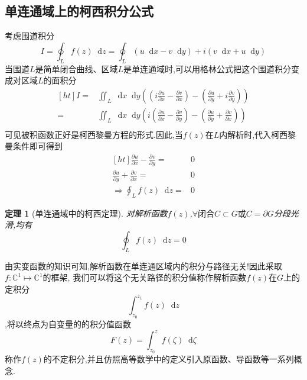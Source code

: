 \documentclass[UTF8]{ctexart}
\newcommand{\dif}{\mathop{}\!\mathrm{d}}
\newtheorem{theorem}{定理}
\begin{document}
\subsection{单连通域上的柯西积分公式}
考虑围道积分
\begin{equation}
  I=\oint_{L}f(z)\dif z=\oint_{L}(u\dif x-v\dif y)+i(v\dif x+u\dif y)
\end{equation}
当围道$L$是简单闭合曲线、区域$L$是单连通域时,可以用格林公式把这个围道积分变成对区域$L$的面积分
\begin{equation}
  \begin{aligned}
    [ht]
    I=&\iint_{L}\dif x\dif y \left(\left(i\frac{\partial u}{\partial x}-\frac{\partial v}{\partial x}\right)-\left(\frac{\partial u}{\partial y}+i\frac{\partial v}{\partial y}\right)\right) \\
  =&\iint_{L}\dif x\dif y \left(i\left(\frac{\partial u}{\partial x}-\frac{\partial v}{\partial y}\right)-\left(\frac{\partial u}{\partial y}+\frac{\partial v}{\partial x}\right)\right) \\
  \end{aligned}
\end{equation}
可见被积函数正好是柯西黎曼方程的形式.因此,当$f(z)$在$L$内解析时,代入柯西黎曼条件即可得到
\begin{equation}
  \begin{aligned}
    [ht]
    \frac{\partial u}{\partial x}-\frac{\partial v}{\partial y}=&0 \\
  \frac{\partial u}{\partial y}+\frac{\partial v}{\partial x}=&0 \\
  \Rightarrow \oint_{L}f(z)\dif z=&0
  \end{aligned}
\end{equation}
\begin{theorem}[单连通域中的柯西定理]
  对解析函数$f(z)$,$\forall \text{闭合}C\subset G\text{或}C=\partial G$分段光滑,均有
  \begin{equation}
    \oint_{L}f(z)\dif z=0
  \end{equation}
\end{theorem}
由实变函数的知识可知,解析函数在单连通区域内的积分与路径无关!因此采取$f : \mathbb{C}^{1} \mapsto\mathbb{C}^{1}$的框架,
我们可以将这个无关路径的积分值称作解析函数$f(z)$在$G$上的定积分
\begin{equation}
  \int_{z_{0}}^{z_{1}}f(z)\dif z
\end{equation}
,将以终点为自变量的的积分值函数
\begin{equation}
  F(z)=\int_{z_{0}}^{z} f(\zeta)\dif \zeta
\end{equation}
称作$f(z)$的不定积分,并且仿照高等数学中的定义引入原函数、导函数等一系列概念.
\end{document}
